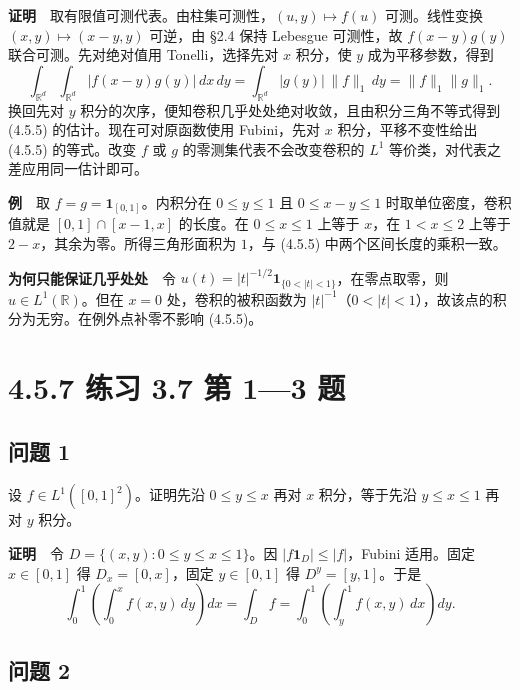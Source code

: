 \documentclass[11pt,a4paper]{article}
\begin{document}
\textbf{证明}　取有限值可测代表。由柱集可测性，\((u,y)\mapsto f(u)\)
可测。线性变换 \((x,y)\mapsto(x-y,y)\) 可逆，由 §2.4 保持 Lebesgue
可测性，故 \(f(x-y)g(y)\) 联合可测。先对绝对值用 Tonelli，选择先对 \(x\)
积分，使 \(y\) 成为平移参数，得到 \begin{equation*}
\int_{\mathbb R^d}\!\int_{\mathbb R^d}|f(x-y)g(y)|\,dx\,dy
=\int_{\mathbb R^d}|g(y)|\,\|f\|_1\,dy=\|f\|_1\|g\|_1.
\end{equation*} 换回先对 \(y\)
积分的次序，便知卷积几乎处处绝对收敛，且由积分三角不等式得到 (4.5.5)
的估计。现在可对原函数使用 Fubini，先对 \(x\) 积分，平移不变性给出
(4.5.5) 的等式。改变 \(f\) 或 \(g\) 的零测集代表不会改变卷积的 \(L^1\)
等价类，对代表之差应用同一估计即可。

\textbf{例}　取 \(f=g=\mathbf1_{[0,1]}\)。内积分在 \(0\le y\le1\) 且
\(0\le x-y\le1\) 时取单位密度，卷积值就是 \([0,1]\cap[x-1,x]\)
的长度。在 \(0\le x\le1\) 上等于 \(x\)，在 \(1<x\le2\) 上等于
\(2-x\)，其余为零。所得三角形面积为 \(1\)，与 (4.5.5)
中两个区间长度的乘积一致。

\textbf{为何只能保证几乎处处}　令
\(u(t)=|t|^{-1/2}\mathbf1_{\{0<|t|<1\}}\)，在零点取零，则
\(u\in L^1(\mathbb R)\)。但在 \(x=0\) 处，卷积的被积函数为
\(|t|^{-1}\)（\(0<|t|<1\)），故该点的积分为无穷。在例外点补零不影响
(4.5.5)。

\clearpage\section[\S{}4.5.7 练习 3.7 第 1---3
题]{4.5.7 练习 3.7 第 1---3
题}\label{ux7ec3ux4e60-3.7-ux7b2c-13-ux9898}

\subsection{问题 1}\label{ux95eeux9898-1}

设 \(f\in L^1([0,1]^2)\)。证明先沿 \(0\le y\le x\) 再对 \(x\)
积分，等于先沿 \(y\le x\le1\) 再对 \(y\) 积分。

\textbf{证明}　令 \(D=\{(x,y):0\le y\le x\le1\}\)。因
\(|f\mathbf1_D|\le|f|\)，Fubini 适用。固定 \(x\in[0,1]\) 得
\(D_x=[0,x]\)，固定 \(y\in[0,1]\) 得 \(D^y=[y,1]\)。于是 \begin{equation*}
\int_0^1\left(\int_0^x f(x,y)\,dy\right)dx
=\int_D f
=\int_0^1\left(\int_y^1 f(x,y)\,dx\right)dy .
\end{equation*}

\subsection{问题 2}\label{ux95eeux9898-2}
\end{document}
